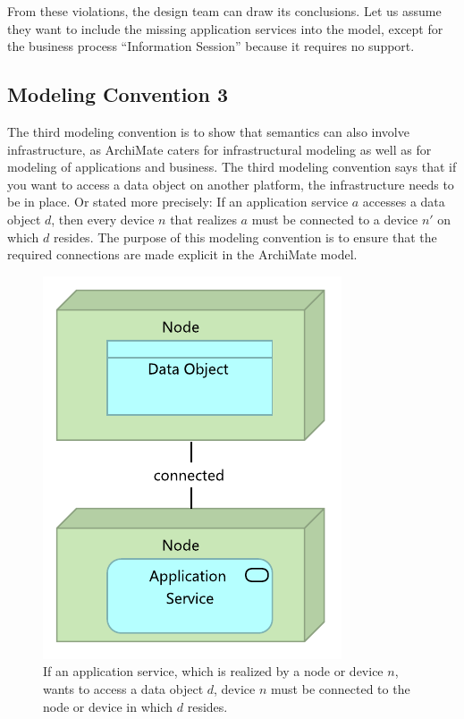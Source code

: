\documentclass[sn-vancouver]{sn-jnl}%
\begin{document}
From these violations, the design team can draw its conclusions.
Let us assume they want to include the missing application services into the model,
except for the business process ``Information Session'' because it requires no support.

\subsection{Modeling Convention 3}
The third modeling convention is to show that semantics can also involve infrastructure,
as ArchiMate caters for infrastructural modeling as well as for modeling of applications and business.
The third modeling convention says that if you want to access a data object on another platform, the infrastructure needs to be in place.
Or stated more precisely:
If an application service $a$ accesses a data object $d$,
then every device $n$ that realizes $a$ must be connected to a device $n'$ on which $d$ resides.
The purpose of this modeling convention is to ensure that the required connections are made explicit in the ArchiMate model.

\begin{figure}[b]
\centering
\includegraphics[clip=true, scale=0.7]{MC3}
\caption{\small{If an application service, which is realized by a node or device $n$, wants to access a data object $d$,
device $n$ must be connected to the node or device in which $d$ resides.}}
\label{MC3}
\end{figure}
\end{document}
